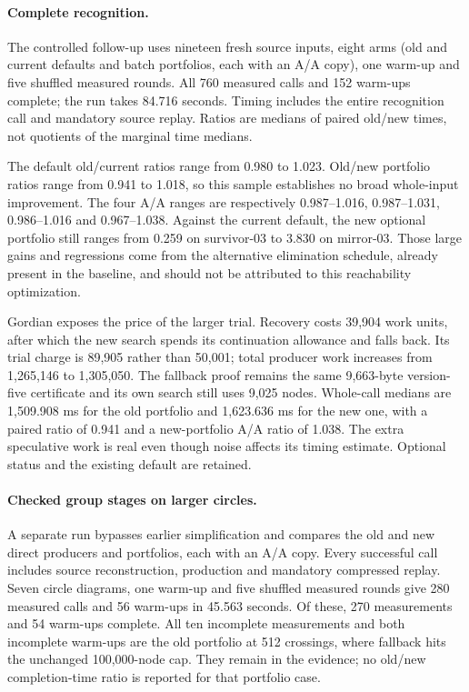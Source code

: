 \paragraph{Complete recognition.}
The controlled follow-up uses nineteen fresh source inputs, eight arms
(old and current defaults and batch portfolios, each with an A/A copy),
one warm-up and five shuffled measured rounds. All 760 measured calls and
152 warm-ups complete; the run takes 84.716 seconds. Timing includes the
entire recognition call and mandatory source replay. Ratios are medians
of paired old/new times, not quotients of the marginal time medians.



The default old/current ratios range from 0.980 to 1.023. Old/new portfolio
ratios range from 0.941 to 1.018, so this sample establishes no broad
whole-input improvement. The four A/A ranges are respectively
0.987--1.016, 0.987--1.031, 0.986--1.016 and 0.967--1.038.
Against the current default, the new optional portfolio still ranges from
0.259 on survivor-03 to 3.830 on mirror-03. Those large gains and regressions
come from the alternative elimination schedule, already present in the
baseline, and should not be attributed to this reachability optimization.

Gordian exposes the price of the larger trial. Recovery costs 39,904 work
units, after which the new search spends its continuation allowance and
falls back. Its trial charge is 89,905 rather than 50,001; total producer
work increases from 1,265,146 to 1,305,050. The fallback proof remains the
same 9,663-byte version-five certificate and its own search still uses
9,025 nodes. Whole-call medians are 1,509.908 ms for the old portfolio and
1,623.636 ms for the new one, with a paired ratio of 0.941 and a new-portfolio
A/A ratio of 1.038. The extra speculative work is real even though noise
affects its timing estimate. Optional status and the existing default are
retained.


\paragraph{Checked group stages on larger circles.}
A separate run bypasses earlier simplification and compares the old and new
direct producers and portfolios, each with an A/A copy. Every successful
call includes source reconstruction, production and mandatory compressed
replay. Seven circle diagrams, one warm-up and five shuffled measured rounds
give 280 measured calls and 56 warm-ups in 45.563 seconds. Of these,
270 measurements and 54 warm-ups complete. All ten incomplete measurements
and both incomplete warm-ups are the old portfolio at 512 crossings, where
fallback hits the unchanged 100,000-node cap. They remain in the evidence;
no old/new completion-time ratio is reported for that portfolio case.

